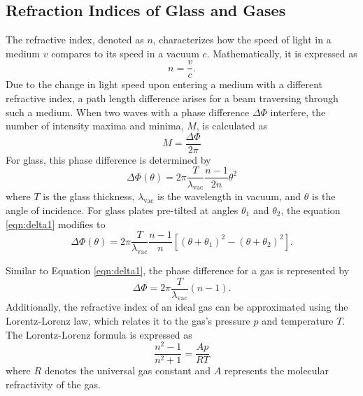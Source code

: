 \subsection{Refraction Indices of Glass and Gases}
The refractive index, denoted as $n$, characterizes how the speed of light in a medium $v$ 
compares to its speed in a vacuum $c$. Mathematically, it is expressed as
\begin{equation*}
    n=\frac{v}{c}.
\end{equation*}
Due to the change in light speed upon entering a medium with a different refractive index, 
a path length difference arises for a beam traversing through such a medium. 
When two waves with a phase difference $\Delta\Phi$ interfere, the number of intensity 
maxima and minima, $M$, is calculated as
\begin{equation}
    M=\frac{\Delta\Phi}{2\pi}
    \label{eqn:M}
\end{equation}
For glass, this phase difference is determined by
\begin{equation}
    \Delta\Phi(\theta)=2\pi\frac{T}{\lambda_\text{vac}}\frac{n-1}{2n}\theta^2
    \label{eqn:delta1}
\end{equation}
where $T$ is the glass thickness, $\lambda_\text{vac}$ is the wavelength in vacuum, and $\theta$ 
is the angle of incidence. For glass plates pre-tilted at angles $\theta_1$ and $\theta_2$, 
the equation \eqref{eqn:delta1} modifies to
\begin{equation}
    \Delta\Phi(\theta)=2\pi\frac{T}{\lambda_\text{vac}}\frac{n-1}{n}[(\theta+\theta_1)^2-(\theta+\theta_2)^2].
    \label{eqn:delta}
\end{equation}

Similar to Equation \eqref{eqn:delta1}, the phase difference for a gas is represented by
\begin{equation*}
    \Delta\Phi=2\pi\frac{T}{\lambda_\text{vac}}(n-1).
\end{equation*}
Additionally, the refractive index of an ideal gas can be approximated using the Lorentz-Lorenz law, 
which relates it to the gas's pressure $p$ and temperature $T$. The Lorentz-Lorenz formula is expressed as
\begin{equation}
    \frac{n^2-1}{n^2+1}=\frac{Ap}{RT}
    \label{eqn:LLL}
\end{equation}
where $R$ denotes the universal gas constant and $A$ represents the molecular refractivity of the gas.
